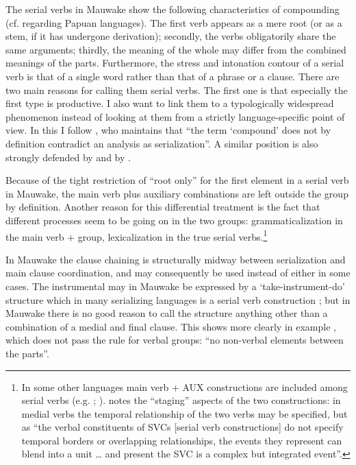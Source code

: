 The serial verbs in Mauwake show the following characteristics of compounding (cf. \citealt[69]{James1983} regarding Papuan languages). The first verb appears as a mere root (or as a stem, if it has undergone derivation); secondly, the verbs obligatorily share the same arguments; thirdly, the meaning of the whole may differ from the combined meanings of the parts. Furthermore, the stress and intonation contour of a serial verb is that of a single word rather than that of a phrase or a clause. There are two main reasons for calling them serial verbs. The first one is that especially the first type is productive. I also want to link them to a typologically widespread phenomenon instead of looking at them from a strictly language-specific point of view. In this I follow \citet[101]{Margetts1999}, who maintains that ``{the term `compound' does not by definition contradict an analysis as serialization}''. A similar position is also strongly defended by \citet[16]{Crowley2002} and by \citet[17]{Givon1991}.

Because of the tight restriction of ``root only'' for the first element in a serial verb in Mauwake, the main verb plus auxiliary combinations are left outside the group by definition. Another reason for this differential treatment is the fact that different processes seem to be going on in the two groups: grammaticalization in the main verb +  group, lexicalization in the true serial verbs.\footnote{In some other languages main verb + AUX constructions are included among serial verbs (e.g. \citealt[29]{James1983}; \citealt[178]{Crowley2002}). \citet[174]{Farr1999} notes the ``staging'' aspects of the two constructions: in medial verbs the temporal relationship of the two verbs may be specified, but as ``the verbal constituents of SVCs [serial verb constructions] do not specify temporal borders or overlapping relationships, the events they represent can blend into a unit {\dots} and present the SVC is a complex but integrated event''.} 

In Mauwake the clause chaining is structurally midway between serialization and main clause coordination, and may consequently be used instead of either in some cases. The instrumental may in Mauwake be expressed by a `take-instrument-do' structure  which in many serializing languages is a serial verb construction \citep[162--74]{Sebba1987}; but in Mauwake there is no good reason to call the structure anything other than a combination of a medial and final clause. This shows more clearly in example , which does not pass the rule for verbal groups: ``no non-verbal elements between the parts''. 


